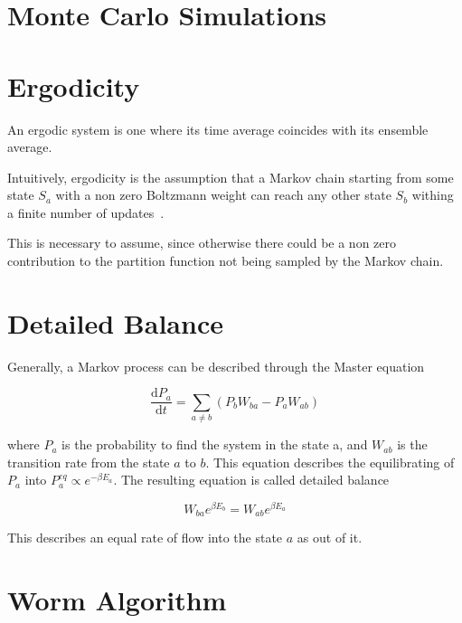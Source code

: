 \section{Monte Carlo Simulations}
\label{sec:MonteCarloSims}



\section{Ergodicity}
\label{sec:Ergodicity}

An ergodic system is one where its time average coincides with its ensemble average. 

Intuitively, ergodicity is the assumption that a Markov chain starting from some state $S_a$ with a non zero Boltzmann weight can reach any other state $S_b$ withing a finite number of updates~\cite{Zwanzig:nonequil_stat_mech}.

This is necessary to assume, since otherwise there could be a non zero contribution to the partition function not being sampled by the Markov chain.

\section{Detailed Balance}
\label{sec:DetailedBalance}

Generally, a Markov process can be described through the Master equation

\begin{equation}
    \frac{\mathrm d P_a}{\mathrm d t} = \sum_{a \neq b} \left ( P_b W_{ba} - P_a W_{ab} \right )
\end{equation}

where $P_a$ is the probability to find the system in the state a, and $W_{ab}$ is the transition rate from the state $a$ to $b$. This equation describes the equilibrating of $P_a$ into $P_a^{eq} \propto e^{-\beta E_a}$. The resulting equation is called detailed balance

\begin{equation}
    W_{ba} e^{\beta E_b} = W_{ab} e^{\beta E_a}
\end{equation}

This describes an equal rate of flow into the state $a$ as out of it.



\section{Worm Algorithm}
\label{sec:WormAlgorithm}

